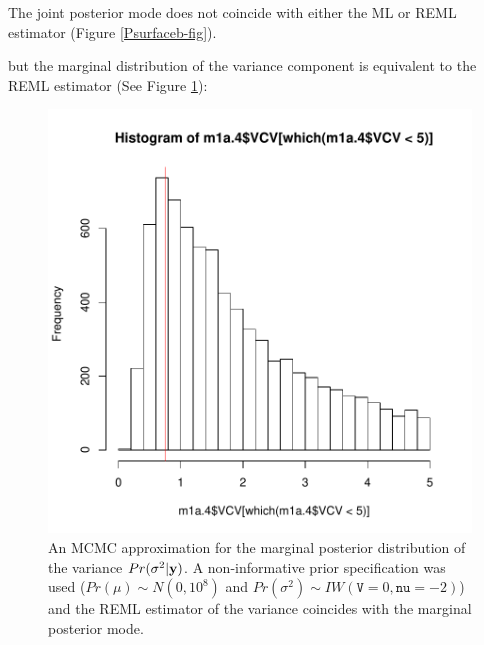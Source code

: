 \documentclass{article}
\begin{document}
The joint posterior mode does not coincide with either the ML or REML estimator (Figure \ref{Psurfaceb-fig}).  


but the marginal distribution of the variance component is equivalent to the REML estimator (See Figure \ref{Pmarg.NI-fig}):

\iftalk
\else
\fi

\begin{figure}[!h]
\begin{center}
\includegraphics{Lecture1-075}
\end{center}
\caption{An MCMC approximation for the marginal posterior distribution of the variance $Pr(\sigma^{2} | {\bf y})$.  A non-informative prior specification was used ($Pr(\mu)\sim N(0, 10^8)$ and  $Pr(\sigma^{2})\sim IW(\texttt{V}=0, \texttt{nu}=-2)$) and the REML estimator of the variance coincides with the marginal posterior mode.}
\label{Pmarg.NI-fig}
\end{figure}


\ifalone


\end{document}
